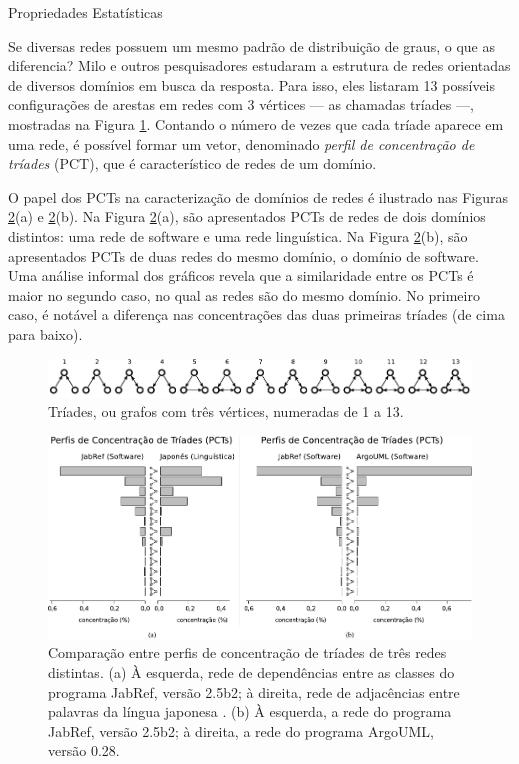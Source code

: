 \begin{section}{Propriedades Estatísticas}

Se diversas redes possuem um mesmo padrão de distribuição de graus, o que as diferencia? Milo e outros pesquisadores \cite{Milo2002} estudaram a estrutura de redes orientadas de diversos domínios em busca da resposta. Para isso, eles listaram 13 possíveis configurações de arestas em redes com 3 vértices --- as chamadas tríades ---, mostradas na Figura \ref{fig:triades}. Contando o número de vezes que cada tríade aparece em uma rede, é possível formar um vetor, denominado \emph{perfil de concentração de tríades} (PCT), que é característico de redes de um domínio. 

O papel dos PCTs na caracterização de domínios de redes é ilustrado nas Figuras \ref{fig:tcp}(a) e \ref{fig:tcp}(b). Na Figura \ref{fig:tcp}(a), são apresentados PCTs de redes de dois domínios distintos: uma rede de software e uma rede linguística. Na Figura \ref{fig:tcp}(b), são apresentados PCTs de duas redes do mesmo domínio, o domínio de software. Uma análise informal dos gráficos revela que a similaridade entre os PCTs é maior no segundo caso, no qual as redes são do mesmo domínio. No primeiro caso, é notável a diferença nas concentrações das duas primeiras tríades (de cima para baixo). 
% 

\begin{figure}[htbp]
	\centering
		\includegraphics[scale=1]{figuras/triads}
	\caption{Tríades, ou grafos com três vértices, numeradas de 1 a 13.}
	\label{fig:triades}
\end{figure}

\begin{figure}[htbp]
	\centering
		\includegraphics[width=1\textwidth]{figuras/tcp}
	\caption{Comparação entre perfis de concentração de tríades de três redes distintas. (a) À esquerda, rede de dependências entre as classes do programa JabRef, versão 2.5b2; à direita, rede de adjacências entre palavras da língua japonesa \cite{Milo2004}. (b) À esquerda, a rede do programa JabRef, versão 2.5b2; à direita, a rede do programa ArgoUML, versão 0.28.}
	\label{fig:tcp}
\end{figure}


\end{section}

